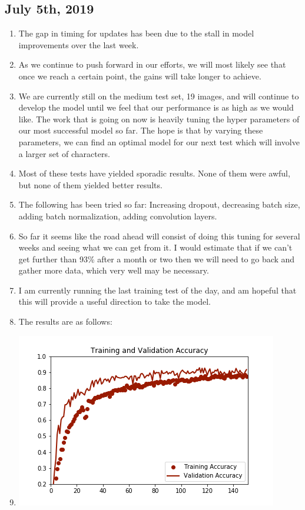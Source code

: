 \documentclass[12pt]{article} %
\begin{document}
\subsection{July 5th, 2019}
\noindent\makebox[\linewidth]{\rule{15cm}{0.4pt}}
\begin{enumerate}[label = (\roman*)]
\item The gap in timing for updates has been due to the stall in model improvements over the last week.
\item As we continue to push forward in our efforts, we will most likely see that once we reach a certain point, the gains will take longer to achieve.
\item We are currently still on the medium test set, 19 images, and will continue to develop the model until we feel that our performance is as high as we would like. The work that is going on now is heavily tuning the hyper parameters of our most successful model so far. The hope is that by varying these parameters, we can find an optimal model for our next test which will involve a larger set of characters.
\item Most of these tests have yielded sporadic results. None of them were awful, but none of them yielded better results.
\item The following has been tried so far: Increasing dropout, decreasing batch size, adding batch normalization, adding convolution layers.
\item So far it seems like the road ahead will consist of doing this tuning for several weeks and seeing what we can get from it. I would estimate that if we can't get further than 93\% after a month or two then we will need to go back and gather more data, which very well may be necessary.
\item I am currently running the last training test of the day, and am hopeful that this will provide a useful direction to take the model.
\item The results are as follows:
\item \includegraphics{acc_history5v4}

\end{enumerate}
\end{document}
